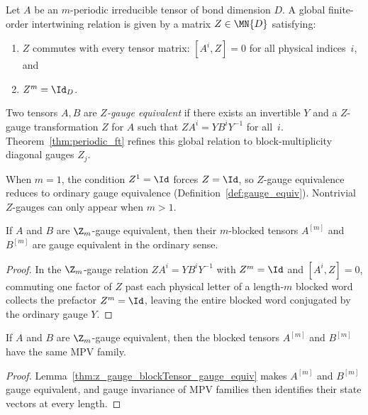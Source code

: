 \begin{definition}
    \label{def:z_gauge_equiv}
    \leanok
    Let $A$ be an $m$-periodic irreducible tensor of bond dimension $D$.
    A global finite-order intertwining relation is given by a matrix
    $Z\in\MN{D}$ satisfying:
    \begin{enumerate}
        \item $Z$ commutes with every tensor matrix: $[A^i,Z]=0$
              for all physical indices~$i$, and
        \item $Z^m=\Id_D$.
    \end{enumerate}
    Two tensors $A,B$ are \emph{$Z$-gauge equivalent} if there exists
    an invertible $Y$ and a $Z$-gauge transformation $Z$ for $A$ such that
    $ZA^i=YB^iY^{-1}$ for all~$i$.
    Theorem~\ref{thm:periodic_ft} refines this global relation to block-multiplicity diagonal gauges $Z_j$.
\end{definition}

\begin{remark}
    \label{rem:z_gauge_trivial_period1}
    \leanok
    When $m=1$, the condition $Z^1=\Id$ forces $Z=\Id$,
    so $Z$-gauge equivalence reduces to ordinary gauge equivalence
    (Definition~\ref{def:gauge_equiv}).
    Nontrivial $Z$-gauges can only appear when $m>1$.
\end{remark}

\begin{lemma}
    \label{thm:z_gauge_blockTensor_gauge_equiv}
    \leanok
    If $A$ and $B$ are $\Z_m$-gauge equivalent, then their $m$-blocked
    tensors $A^{[m]}$ and $B^{[m]}$ are gauge equivalent in the ordinary sense.
\end{lemma}

\begin{proof}\leanok
    In the $\Z_m$-gauge relation $ZA^i=YB^iY^{-1}$ with $Z^m=\Id$ and
    $[A^i,Z]=0$, commuting one factor of $Z$ past each physical letter of a
    length-$m$ blocked word collects the prefactor $Z^m=\Id$, leaving the
    entire blocked word conjugated by the ordinary gauge $Y$.
\end{proof}

\begin{corollary}
    \label{cor:z_gauge_blockTensor_same_mpv}
    \leanok
    If $A$ and $B$ are $\Z_m$-gauge equivalent, then the blocked tensors
    $A^{[m]}$ and $B^{[m]}$ have the same MPV family.
\end{corollary}

\begin{proof}\leanok
    Lemma~\ref{thm:z_gauge_blockTensor_gauge_equiv} makes $A^{[m]}$ and
    $B^{[m]}$ gauge equivalent, and gauge invariance of MPV families then
    identifies their state vectors at every length.
\end{proof}
